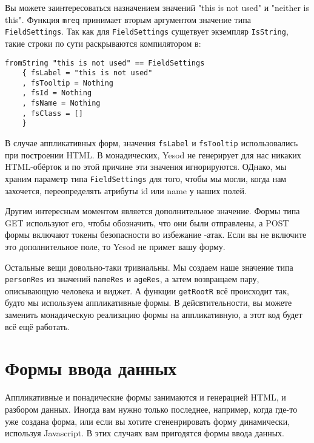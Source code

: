 Вы можете заинтересоваться назначением значений "this is not used" и "neither is this".
Функция \lstinline'mreq' принимает вторым аргументом значение типа \lstinline'FieldSettings'.
Так как для \lstinline'FieldSettings' сущетвует экземпляр \lstinline'IsString', такие строки 
по сути раскрываются компилятором в:

\begin{lstlisting}
fromString "this is not used" == FieldSettings
    { fsLabel = "this is not used"
    , fsTooltip = Nothing
    , fsId = Nothing
    , fsName = Nothing
    , fsClass = []
    }
\end{lstlisting}

В случае аппликативных форм, значения \lstinline'fsLabel' и \lstinline'fsTooltip'
использовались при построении HTML. В монадических, Yesod не генерирует для нас
никаких HTML-обёрток и по этой причине эти значения игнорируются. ОДнако, мы храним 
параметр типа \lstinline'FieldSettings' для того, чтобы мы могли, 
когда нам захочется, переопределять атрибуты id или name у наших полей.

Другим интересным моментом является дополнительное значение. Формы типа GET используют
его, чтобы обозначить, что они были отправлены, а POST формы включают токены безопасности
во избежание 
-атак. 
Если вы не включите это дополнительное поле, то Yesod не примет вашу форму.

Остальные вещи довольно-таки тривиальны. Мы создаем наше значение типа 
\lstinline'personRes' из значений \lstinline'nameRes' и \lstinline'ageRes', а 
затем возвращаем пару, описывающую человека и виджет. А функции \lstinline'getRootR'
всё происходит так, будто мы используем аппликативные формы. В дейсвтительности, вы можете 
заменить монадическую реализацию формы на аппликативную, а этот код будет всё ещё работать.

\section{Формы ввода данных}
Аппликативные и понадические формы занимаются и генерацией HTML, и разбором данных.
Иногда вам нужно только последнее, например, когда где-то уже создана форма, или если вы
хотите сгененрировать форму динамически, используя Javascript. В этих случаях вам пригодятся
формы ввода данных.

